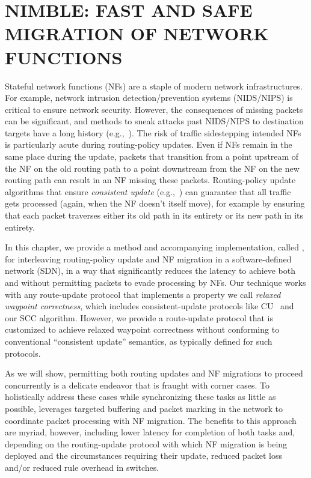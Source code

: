 \chapter{\uppercase{Nimble: Fast and Safe Migration of Network Functions}}
\label{chap:nimble}
\graphicspath{{./}{./fig/}{./fig/nimble/}}

Stateful network functions (NFs) are a staple of modern network
infrastructures.  For example, network intrusion detection/prevention systems (NIDS/NIPS) is critical to ensure network security. However, the
consequences of missing packets can be significant, and methods to
sneak attacks past NIDS/NIPS to destination targets have a long
history (e.g.,~\cite{chaboya2006:network, cheng2012:evasion,
  corona2013:adversarial}). The risk of traffic sidestepping intended NFs is particularly acute
during routing-policy updates.  Even if NFs remain in the same place
during the update, packets that transition from a point upstream of
the NF on the old routing path to a point downstream from the NF on
the new routing path can result in an NF missing these packets.
Routing-policy update algorithms that ensure \textit{consistent
  update} (e.g.,~\cite{CU, tsu}) can guarantee that all traffic
gets processed (again, when the NF doesn't itself move), for example
by ensuring that each packet traverses either its old path in its
entirety or its new path in its entirety.

In this chapter, we provide a method and accompanying implementation,
called \sysname, for interleaving routing-policy update and NF
migration in a software-defined network (SDN), in a way that
significantly reduces the latency to achieve both and without
permitting packets to evade processing by NFs.  Our technique works
with any route-update protocol that implements a property we call
\textit{relaxed waypoint correctness}, which includes
consistent-update protocols like CU~\cite{CU} and our SCC algorithm.
However, we provide a route-update protocol that is customized to
achieve relaxed waypoint correctness without conforming to
conventional ``consistent update'' semantics, as typically defined for
such protocols.

As we will show, permitting both routing updates and NF migrations to
proceed concurrently is a delicate endeavor that is fraught with
corner cases.  To holistically address these cases while synchronizing
these tasks as little as possible, \sysname leverages targeted
buffering and packet marking in the network to coordinate packet
processing with NF migration.  The benefits to this approach are
myriad, however, including lower latency for completion of both tasks
and, depending on the routing-update protocol with which NF migration
is being deployed and the circumstances requiring their update,
reduced packet loss and/or reduced rule overhead in switches.

